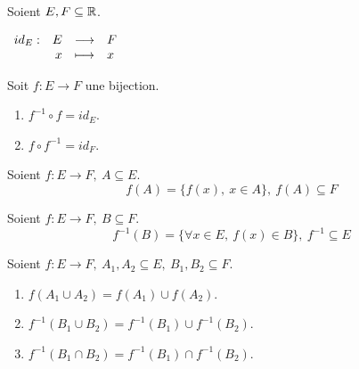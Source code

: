 \begin{definition}
    Soient $E, F \subseteq \mathbb{R}$.
	\begin{center}
		$
		\begin{array}{rrcl} id_E : & E & \longrightarrow & F \\ & x & \longmapsto & x \end{array}
		$
	\end{center}
\end{definition}

\begin{proposition}
	Soit $f : E \to F$ une bijection.
    \begin{multicols}{2}
        \begin{enumerate}
            \item $f^{-1} \circ f = id_E$.
            \item $f \circ f^{-1} = id_F$.
        \end{enumerate}
    \end{multicols}
\end{proposition}

\begin{definition}
    Soient $f : E \to F,\ A \subseteq E$.
	\[ f(A) = \{ f(x),\ x \in A \},\ f(A) \subseteq F \]
\end{definition}

\begin{definition}
	Soient $f : E \to F,\ B \subseteq F$.
	\[ f^{-1}(B) = \{ \forall x \in E,\ f(x) \in B \},\ f^{-1} \subseteq E \]
\end{definition}

\begin{proposition}
    Soient $f : E \to F,\ A_1, A_2 \subseteq E,\ B_1, B_2 \subseteq F$.
    \begin{enumerate}
        \item $f(A_1 \cup A_2) = f(A_1) \cup f(A_2)$.
        \item $f^{-1} (B_1 \cup B_2) = f^{-1} (B_1) \cup f^{-1} (B_2)$.
        \item $f^{-1} (B_1 \cap B_2) = f^{-1} (B_1) \cap f^{-1} (B_2)$.
    \end{enumerate}
\end{proposition} 

